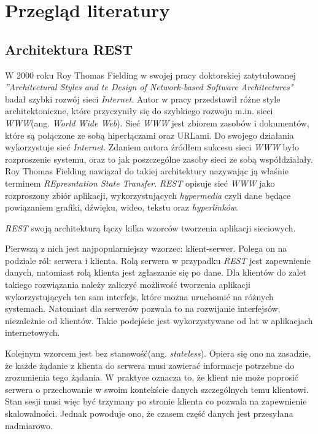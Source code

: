 \chapter{Przegląd literatury}

\section{Architektura REST}

W 2000 roku Roy Thomas Fielding w swojej pracy doktorskiej zatytułowanej \textsl{''Architectural Styles and te Design of Network-based Software Architectures"} badał szybki rozwój sieci \textsl{Internet}. Autor w pracy przedstawił różne style architektoniczne, które przyczyniły się do szybkiego rozwoju m.in. sieci \textsl{WWW}(ang. \textsl{World Wide Web}). Sieć \textsl{WWW} jest zbiorem zasobów i dokumentów, które są połączone ze sobą hiperłączami oraz URLami. Do swojego działania wykorzystuje sieć \textsl{Internet}.  Zdaniem autora źródłem sukcesu sieci \textsl{WWW} było rozproszenie systemu, oraz to jak poszczególne zasoby sieci ze sobą współdziałały\cite{restinpractice}. Roy Thomas Fielding nawiązał do takiej architektury nazywając ją właśnie terminem \textsl{REpresntation State Transfer}. \textsl{REST} opisuje sieć \textsl{WWW} jako rozproszony zbiór aplikacji, wykorzystujących \textsl{hypermedia} czyli dane będące powiązaniem grafiki, dźwięku, wideo, tekstu oraz \textsl{hyperlinków}. 

\textsl{REST} swoją architekturą łączy kilka wzorców tworzenia aplikacji sieciowych. 

Pierwszą z nich jest najpopularniejszy wzorzec: klient-serwer. Polega on na podziale ról: serwera i klienta. Rolą serwera w przypadku \textsl{REST} jest zapewnienie danych, natomiast rolą klienta jest zgłaszanie się po dane. Dla klientów do zalet takiego rozwiązania należy zaliczyć możliwość tworzenia aplikacji wykorzystujących ten sam interfejs, które można uruchomić na różnych systemach. Natomiast dla serwerów pozwala to na rozwijanie interfejsów, niezależnie od klientów. Takie podejście jest wykorzystywane od lat w aplikacjach internetowych. 

Kolejnym wzorcem jest bez stanowość(ang. \textsl{stateless}). Opiera się ono na zasadzie, że każde żądanie z klienta do serwera musi zawierać informacje potrzebne do zrozumienia tego żądania. W praktyce oznacza to, że klient nie może poprosić serwera o przechowanie w swoim kontekście danych szczególnych temu klientowi. Stan sesji musi więc być trzymany po stronie klienta co pozwala na zapewnienie skalowalności. Jednak powoduje ono, że czasem część danych jest przesyłana nadmiarowo.

